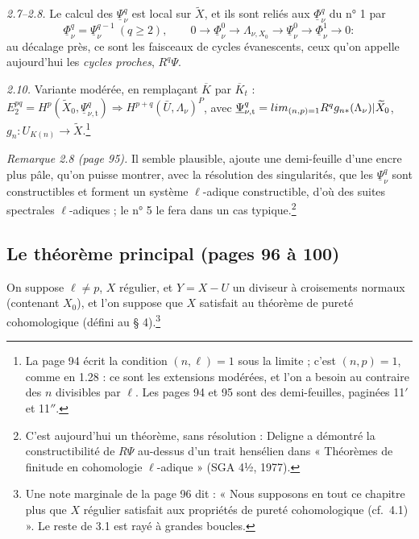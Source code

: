 \documentclass[11pt,a4paper]{article}
\begin{document}
\emph{2.7--2.8.} Le calcul des $\underline\Psi^q_\nu$ est local sur
$\widetilde X$, et ils sont reliés aux $\underline\Phi^q_\nu$ du n° 1 par
\[
  \underline\Phi^q_\nu = \underline\Psi^{q-1}_\nu \ (q \geq 2), \qquad
  0 \to \underline\Phi^0_\nu \to \Lambda_{\nu, X_0} \to \underline\Psi^0_\nu
  \to \underline\Phi^1_\nu \to 0 :
\]
au décalage près, ce sont les faisceaux de cycles évanescents, ceux qu'on
appelle aujourd'hui les \emph{cycles proches}, $R^q\Psi$.

\emph{2.10.} Variante modérée, en remplaçant $\overline K$ par $\overline K_t$ :
$E_2^{pq} = H^p(\widetilde X_0, \underline\Psi^q_{\nu,\mathrm{t}}) \Rightarrow
H^{p+q}(\bar U, \Lambda_\nu)^P$, avec $\underline\Psi^q_{\nu,\mathrm{t}} =
\varinjlim_{(n,p)=1} R^q g_{n*}(\Lambda_\nu)|\widetilde X_0$, $g_n :
U_{K(n)} \to \widetilde X$.\footnote{La page 94 écrit la condition
$(n, \ell) = 1$ sous la limite ; c'est $(n,p) = 1$, comme en 1.28 : ce sont les
extensions modérées, et l'on a besoin au contraire des $n$ divisibles par
$\ell$. Les pages 94 et 95 sont des demi-feuilles, paginées 11$'$ et 11$''$.}

\emph{Remarque 2.8 (page 95).} Il semble plausible, ajoute une demi-feuille
d'une encre plus pâle, qu'on puisse montrer, avec la résolution des
singularités, que les $\underline\Psi^q_\nu$ sont constructibles et forment un
système $\ell$-adique constructible, d'où des suites spectrales $\ell$-adiques ;
le n° 5 le fera dans un cas typique.\footnote{C'est aujourd'hui un théorème, sans
résolution : Deligne a démontré la constructibilité de $R\Psi$ au-dessus d'un
trait hensélien dans « Théorèmes de finitude en cohomologie $\ell$-adique »
(SGA 4½, 1977).}

\subsection*{Le théorème principal (pages 96 à 100)}

On suppose $\ell \neq p$, $X$ régulier, et $Y = X - U$ un diviseur à croisements
normaux (contenant $X_0$), et l'on suppose que $X$ satisfait au théorème de
pureté cohomologique (défini au § 4).\footnote{Une note marginale de la page 96
dit : « Nous supposons en tout ce chapitre plus que $X$ régulier satisfait aux
propriétés de pureté cohomologique (cf.\ 4.1) ». Le reste de 3.1 est rayé à
grandes boucles.}
\end{document}
